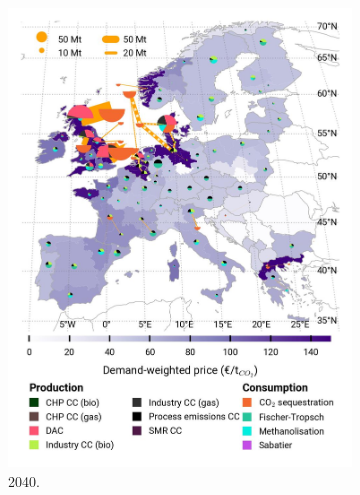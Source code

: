\documentclass[preprint,12pt,sort&compress]{elsarticle}
\begin{document}
\begin{figure}[htbp]
\begin{subfigure}[t]{0.33\textwidth}
      \includegraphics[width=1\textwidth]{maps/pcipmi/base_s_adm___2040-balance_map_co2_stored} 
      \caption{ 2040.}
      \label{fig:PCI_lt_2040_co2}
  \end{subfigure}
  \begin{subfigure}[t]{0.33\textwidth}
      \vspace{0pt}

\end{subfigure}
\end{figure}
\end{document}
